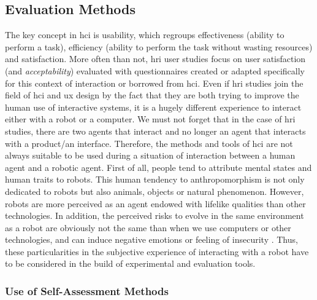 \documentclass[a4paper,11pt,twoside]{StyleThese}
\begin{document}
\subsection{Evaluation Methods}
\label{sec:evaluation}

The key concept in \acrshort{hci} is usability, which regroups effectiveness (ability to perform a task), efficiency (ability to perform the task without wasting resources) and satisfaction. More often than not, \acrshort{hri} user studies focus on user satisfaction (and \textit{acceptability}) evaluated with questionnaires created or adapted specifically for this context of interaction or borrowed from \acrshort{hci}. Even if \acrshort{hri} studies join the field of \acrlong{hci} and \acrlong{ux} design by the fact that they are both trying to improve the human use of interactive systems, it is a hugely different experience to interact either with a robot or a computer. We must not forget that in the case of \acrshort{hri} studies, there are two agents that interact and no longer an agent that interacts with a product/an interface. Therefore, the methods and tools of \acrshort{hci} are not always suitable to be used during a situation of interaction between a human agent and a robotic agent. First of all, people tend to attribute mental states and human traits to robots. This human tendency to anthropomorphism is not only dedicated to robots but also animals, objects or natural phenomenon. However, robots are more perceived as an agent endowed with lifelike qualities than other technologies. 
In addition, the perceived risks to evolve in the same environment as a robot are obviously not the same than when we use computers or other technologies, and can induce negative emotions or feeling of insecurity \cite{dautenhahn2006may}. 
Thus, these particularities in the subjective experience of interacting with a robot have to be considered in the build of experimental and evaluation tools.

\subsubsection{Use of Self-Assessment Methods}
\end{document}
